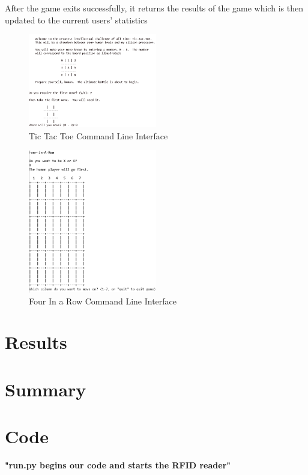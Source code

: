 \documentclass[notitlepage,11pt]{article}
\begin{document}
        After the game exits successfully, it returns the results of the game 
        which is then updated to the current users' statistics

        \begin{figure}[h]
            \centering
            \includegraphics[width=0.5\textwidth]{images/tictac.png}
            \caption{Tic Tac Toe Command Line Interface}
            \label{fig:ticCommand}
        \end{figure}

        \begin{figure}[h]
            \centering
            \includegraphics[width=0.5\textwidth]{images/four.png}
            \caption{ Four In a Row Command Line Interface}
            \label{fig:fourCommand}
        \end{figure}

    \section{Results}

    \section{Summary}

    \section{Code}
        \textbf{"run.py begins our code and starts the RFID reader"}
        
\end{document}
